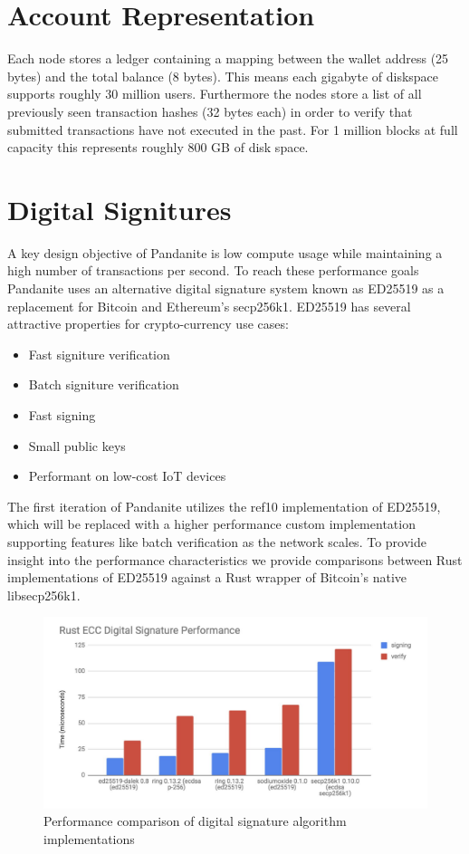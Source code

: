 \documentclass[11pt, a4paper]{elegantpaper}
\begin{document}
\section{Account Representation}
Each node stores a ledger containing a mapping between the wallet address (25 bytes) and the
total balance (8 bytes). This means each gigabyte of diskspace supports roughly 30 million users.
Furthermore the nodes store a list of all previously seen transaction hashes (32 bytes each) in order
to verify that submitted transactions have not executed in the past. For 1 million blocks at full
capacity this represents roughly 800 GB of disk space.
\section{Digital Signitures}
A key design objective of Pandanite is low compute usage while maintaining a high number of
transactions per second. To reach these performance goals Pandanite uses an alternative digital
signature system known as ED25519 as a replacement for Bitcoin and Ethereum’s secp256k1.
ED25519 has several attractive properties for crypto-currency use cases:
\begin{itemize}
	\item Fast signiture verification
	\item Batch signiture verification
	\item Fast signing
	\item Small public keys
	\item Performant on low-cost IoT devices
\end{itemize}
The first iteration of Pandanite utilizes the ref10 implementation of ED25519, which will be replaced
with a higher performance custom implementation supporting features like batch verification as
the network scales. To provide insight into the performance characteristics we provide comparisons
between Rust implementations of ED25519 against a Rust wrapper of Bitcoin’s native libsecp256k1.
\begin{figure}[h]
\includegraphics[width=\textwidth]{fig3}
\centering
\caption{Performance comparison of digital signature algorithm implementations}
\end{figure}
\end{document}

